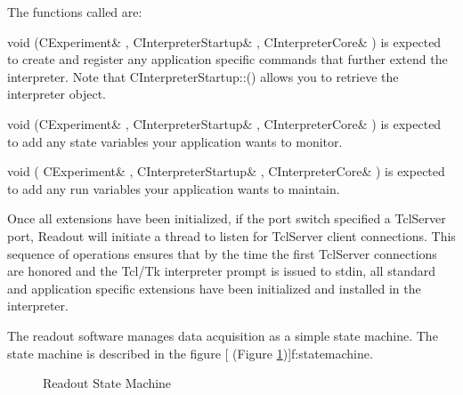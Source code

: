       
      The functions called are:
      \begin{description}
	 \item{void (CExperiment\&           ,
								     CInterpreterStartup\& ,
								     CInterpreterCore\&     )}
	     is expected to create and register
	    any application specific commands that further extend the interpreter.
	    Note that CInterpreterStartup::() allows you to
	    retrieve the interpreter object.
	 \item{void (CExperiment\&       ,
								     CInterpreterStartup\& ,
								     CInterpreterCore\&     )}
	    is expected to add any state
	   variables your application wants to monitor.
	 \item{void ( CExperiment\&           ,
								     CInterpreterStartup\& ,
								     CInterpreterCore\&     )}
	     is expected to add any run
	    variables your application wants to maintain.
      \end{description}
      
      
      Once all extensions have been initialized, if the {\dash\dash}port 
      switch specified a TclServer port, Readout will initiate a thread
      to listen for TclServer client connections.  This sequence of operations
      ensures that by the time the first TclServer connections are honored
      and the Tcl/Tk interpreter prompt is issued to stdin, all standard and
      application specific extensions have been initialized and installed in 
      the interpreter.
      
      
   
   The readout software manages data acquisition as a simple state machine. 
   The state machine is described in the figure 
   [
      (Figure \ref{f:statemachine})]{f:statemachine}.
   
        \begin{figure}[htb]
	 \caption{Readout State Machine}\label{f:statemachine}
      \end{figure}
  
